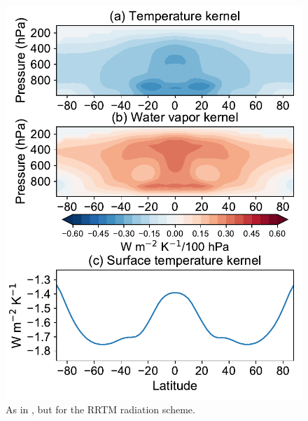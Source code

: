 \begin{figure}[ht]
	\centering
	\includegraphics[width=0.45\linewidth]{figs/polar_amp/kernels_rrtm}
	\caption[Annual-mean and zonal-mean temperature, water vapor and surface temperature radiative kernels for RRTM radiation scheme]{As in , but for the RRTM radiation scheme.}
	\label{fig:rrtm_kernels}
\end{figure}

